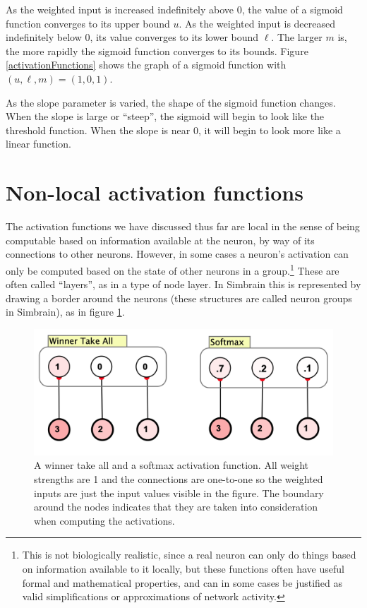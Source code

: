    As the weighted input is increased indefinitely above $0$, the value of a 
sigmoid function converges to its upper bound $u$. As the weighted input is 
decreased indefinitely below $0$, its value converges to its lower bound $\ell$.
The larger $m$ is, the more rapidly the sigmoid function converges to its 
bounds. Figure \ref{activationFunctions} shows the graph of a sigmoid function with 
$(u,\ell,m) = (1,0,1)$. 

As the slope parameter is varied, the shape of the sigmoid function changes. When the slope is
large or ``steep'', the sigmoid will begin to look like the threshold function. When the slope is near $0$, it will begin to look more like a linear function.

\section{Non-local activation functions}

The activation functions we have discussed thus far are local in the sense of being computable based on information available at the neuron, by way of its connections to other neurons. However, in some cases a neuron's activation can only be computed based on the state of other neurons in a group.\footnote{This is not biologically realistic, since a real neuron can only do things based on information available to it locally, but these functions often have useful formal and mathematical properties, and can in some cases be justified as valid simplifications or approximations of network activity.} These are often called ``layers'', as in a type of node layer. In Simbrain this is represented by drawing a border around the neurons (these structures are called neuron groups in Simbrain), as in figure \ref{wta_softmax}.

\begin{figure}[h]
\centering
\includegraphics[scale=.4]{./images/softmax_wta.png}
\caption[Jeff Yoshimi.]{A winner take all and a softmax activation function. All weight strengths are 1 and the connections are one-to-one so the weighted inputs are just the input values visible in the figure. The boundary around the nodes indicates that they are taken into consideration when computing the activations.}
\label{wta_softmax}
\end{figure}

